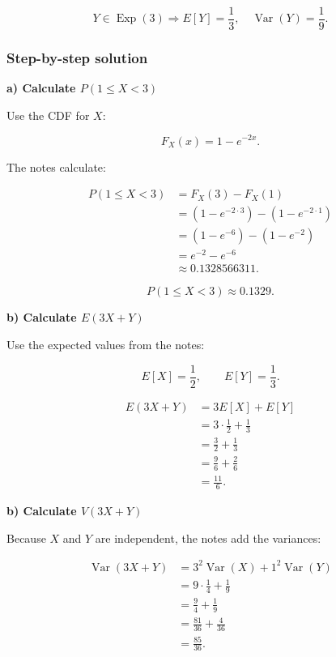 \documentclass[10pt]{article}
\begin{document}
\[
Y\in \operatorname{Exp}(3)
\Rightarrow
E[Y]=\frac{1}{3},
\quad
\operatorname{Var}(Y)=\frac{1}{9}.
\]

\subsubsection*{Step-by-step solution}

\textbf{a) Calculate \(P(1\leq X<3)\)}

Use the CDF for \(X\):

\[
F_X(x)=1-e^{-2x}.
\]

The notes calculate:

\begin{align*}
P(1\leq X<3)
&=F_X(3)-F_X(1) \\[2mm]
&=(1-e^{-2\cdot 3})
 -(1-e^{-2\cdot 1}) \\[2mm]
&=(1-e^{-6})-(1-e^{-2}) \\[2mm]
&=e^{-2}-e^{-6} \\[2mm]
&\approx 0.1328566311.
\end{align*}

\[
P(1\leq X<3)
\approx 0.1329.
\]

\textbf{b) Calculate \(E(3X+Y)\)}

Use the expected values from the notes:

\[
E[X]=\frac{1}{2},
\qquad
E[Y]=\frac{1}{3}.
\]

\begin{align*}
E(3X+Y)
&=3E[X]+E[Y] \\[2mm]
&=3\cdot \frac{1}{2}
  +\frac{1}{3} \\[2mm]
&=\frac{3}{2}+\frac{1}{3} \\[2mm]
&=\frac{9}{6}+\frac{2}{6} \\[2mm]
&=\frac{11}{6}.
\end{align*}

\textbf{b) Calculate \(V(3X+Y)\)}

Because \(X\) and \(Y\) are independent,
the notes add the variances:

\begin{align*}
\operatorname{Var}(3X+Y)
&=3^2\operatorname{Var}(X)
  +1^2\operatorname{Var}(Y) \\[2mm]
&=9\cdot \frac{1}{4}
  +\frac{1}{9} \\[2mm]
&=\frac{9}{4}+\frac{1}{9} \\[2mm]
&=\frac{81}{36}
  +\frac{4}{36} \\[2mm]
&=\frac{85}{36}.
\end{align*}
\end{document}
